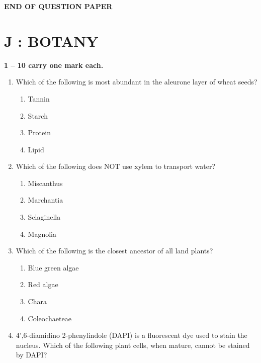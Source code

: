 \documentclass[journal,12pt,onecolumn]{IEEEtran}
\begin{document}
\begin{center}
\textbf{END OF QUESTION PAPER}
\end{center}
\newpage
\section*{\centering J : BOTANY}

\noindent \textbf{ 1 -- 10 carry one mark each.}

\begin{enumerate}[label=\arabic*.]

\item Which of the following is most abundant in the aleurone layer of wheat seeds?

\begin{multicols}{4}
\begin{enumerate}[label=(\Alph*)]
\item Tannin
\item Starch
\item Protein
\item Lipid
\end{enumerate}
\end{multicols}

\item Which of the following does NOT use xylem to transport water?

\begin{multicols}{4}
\begin{enumerate}[label=(\Alph*)]
\item Miscanthus
\item Marchantia
\item Selaginella
\item Magnolia
\end{enumerate}
\end{multicols}

\item Which of the following is the closest ancestor of all land plants?

\begin{multicols}{4}
\begin{enumerate}[label=(\Alph*)]
\item Blue green algae
\item Red algae
\item Chara
\item Coleochaeteae
\end{enumerate}
\end{multicols}

\item 4',6-diamidino 2-phenylindole (DAPI) is a fluorescent dye used to stain the nucleus. Which of the following plant cells, when mature, cannot be stained by DAPI?


\end{enumerate}
\end{document}

